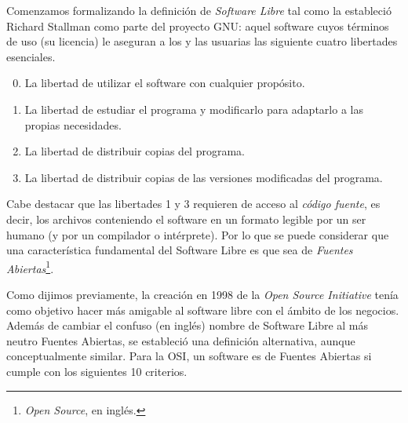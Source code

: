 

Comenzamos formalizando la definición de {\it Software Libre} tal como la estableció Richard Stallman como parte del proyecto GNU: aquel software cuyos términos de uso (su licencia) le aseguran a los y las usuarias las siguiente cuatro libertades esenciales.

\begin{enumerate}
\setcounter{enumi}{-1}
\item La libertad de utilizar el software con cualquier propósito.
\item La libertad de estudiar el programa y modificarlo para adaptarlo a las propias necesidades.
\item La libertad de distribuir copias del programa.
\item La libertad de distribuir copias de las versiones modificadas del programa.
\end{enumerate}

Cabe destacar que las libertades 1 y 3 requieren de acceso al \emph{código fuente}, es decir, los archivos conteniendo el software en un formato legible por un ser humano (y por un compilador o intérprete). Por lo que se puede considerar que una característica fundamental del Software Libre es que sea de \emph{Fuentes Abiertas}\footnote{\emph{Open Source}, en inglés.}. 

Como dijimos previamente, la creación en 1998 de la \emph{Open Source Initiative} tenía como objetivo hacer más amigable al software libre con el ámbito de los negocios. Además de cambiar el confuso (en inglés) nombre de Software Libre al más neutro Fuentes Abiertas, se estableció una definición alternativa, aunque conceptualmente similar. Para la OSI, un software es de Fuentes Abiertas si cumple con los siguientes 10 criterios.

